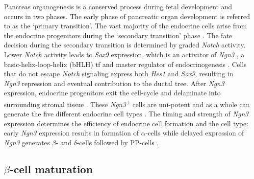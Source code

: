 Pancreas organogenesis is a conserved process during fetal development and occurs in two phases. The early phase of pancreatic organ development is referred to as the `primary transition'. The vast majority of the endocrine cells arise from the endocrine progenitors during the `secondary transition' phase \textbf{\cite{pan_pancreas_2011}}. %
The fate decision during the secondary transition is determined by graded \textit{Notch} activity. Lower \textit{Notch} activity leads to \textit{Sox9} expression, which is an activator of \textit{Ngn3} \textbf{\cite{shih_pancreas_2013}}, a basic-helix-loop-helix (bHLH) \gls{tf} and master regulator of endocrinogenesis \textbf{\cite{gu_direct_2002}}. Cells that do not escape \textit{Notch} signaling express both \textit{Hes1} and \textit{Sox9}, resulting in \textit{Ngn3} repression and eventual contribution to the ductal tree. %
After \textit{Ngn3} expression, endocrine progenitors exit the cell-cycle and delaminate into surrounding stromal tissue \textbf{\cite{shih_pancreas_2013, gouzi_neurogenin3_2011, miyatsuka_neurogenin3_2011}}. These \textit{Ngn3\textsuperscript{+}} cells are uni-potent and as a whole can generate the five different endocrine cell types \textbf{\cite{shih_pancreas_2013,gu_direct_2002,miyatsuka_neurogenin3_2011}}. The timing and strength of \textit{Ngn3} expression determines the efficiency of endocrine cell formation and the cell type: early \textit{Ngn3} expression results in formation of $\alpha$-cells while delayed expression of \textit{Ngn3}  generates $\beta$- and $\delta$-cells followed by PP-cells \textbf{\cite{johansson_temporal_2007}}.



\subsection{$\beta$-cell maturation} %
\label{sec:betamat}

